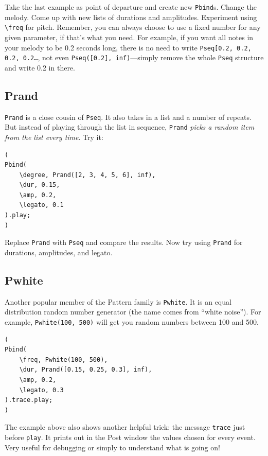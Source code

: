 Take the last example as point of departure and create new \texttt{Pbind}s. Change the melody. Come up with new lists of durations and amplitudes. Experiment using \texttt{\textbackslash freq} for pitch. Remember, you can always choose to use a fixed number for any given parameter, if that's what you need. For example, if you want all notes in your melody to be 0.2 seconds long, there is no need to write \texttt{Pseq[0.2, 0.2, 0.2, 0.2\dots}, not even \texttt{Pseq([0.2], inf)}---simply remove the whole \texttt{Pseq} structure and write 0.2 in there.

\subsection{Prand}

\texttt{Prand} is a close cousin of \texttt{Pseq}. It also takes in a list and a number of repeats. But instead of playing through the list in sequence, \texttt{Prand} \emph{picks a random item from the list every time}. Try it:

 
\begin{lstlisting}[style=SuperCollider-IDE, basicstyle=\scttfamily\footnotesize]
(
Pbind(
	\degree, Prand([2, 3, 4, 5, 6], inf),
	\dur, 0.15,
	\amp, 0.2,
	\legato, 0.1
).play;
)
\end{lstlisting}
 

Replace \texttt{Prand} with \texttt{Pseq} and compare the results. Now try using \texttt{Prand} for durations, amplitudes, and legato.

\subsection{Pwhite}

Another popular member of the Pattern family is \texttt{Pwhite}. It is an equal distribution random number generator (the name comes from ``white noise''). For example, \texttt{Pwhite(100, 500)} will get you random numbers between 100 and 500.
 
\begin{lstlisting}[style=SuperCollider-IDE, basicstyle=\scttfamily\footnotesize]
(
Pbind(
	\freq, Pwhite(100, 500),
	\dur, Prand([0.15, 0.25, 0.3], inf),
	\amp, 0.2,
	\legato, 0.3
).trace.play;
)
\end{lstlisting}
 

The example above also shows another helpful trick: the message \texttt{trace} just before \texttt{play}. It prints out in the Post window the values chosen for every event. Very useful for debugging or simply to understand what is going on!

